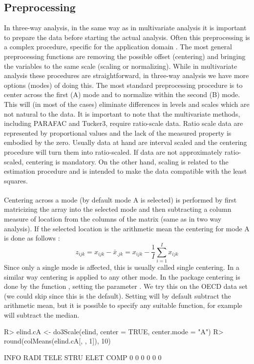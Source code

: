 \documentclass[article,shortnames, nojss]{jss}
\begin{document}
\subsection{Preprocessing}
\label{sec:preprocessing}
In three-way analysis, in the same way as in multivariate analysis it
is important to prepare the data before starting the actual analysis.
Often this preprocessing is a complex procedure, specific for the
application domain \citep[see for example][]{Engelen:2007}. The most
general preprocessing functions are removing the possible offset (centering)
and bringing the variables to the same scale (scaling or normalizing). While
in multivariate analysis these procedures are straightforward, in
three-way analysis we have more options (modes) of doing this. The most
standard preprocessing procedure is to center across the first (A) mode
and to normalize within the second (B) mode. This will (in most of the cases)
eliminate differences in levels and scales which are not natural to the data.
It is important to note that the multivariate methods,
including PARAFAC and Tucker3, require ratio-scale  data.
Ratio scale data are represented by proportional values and the lack
of the measured property is embodied by the zero. Usually data at hand are
interval scaled and the centering procedure will turn them into ratio-scaled.
If data are not approximately ratio-scaled, centering is mandatory.
On the other hand, scaling is related to the estimation procedure
and is intended to make the data compatible with the least squares.\\\\
Centering across a mode (by default mode A is selected) is performed by
first matricizing the array into the selected mode and then subtracting
a column measure of location from the columns of the matrix (same as in two way analysis).
If the selected location is the arithmetic mean the centering for mode A is done as follows :
\[z_{ijk}=x_{ijk}-\bar x_{.jk}=x_{ijk} - \frac{1}{I}\sum \limits_{i=1}^I x_{ijk}
\]
Since only a single mode is affected, this is usually called single centering.
In a similar way centering is applied to any other mode. In the package 
centering is done by the function , setting the parameter .
We try this on the OECD data set (we could skip 
since this is the default). Setting  will by default subtract the
arithmetic mean, but it is possible to specify any suitable function,
for example  will subtract the median.
\begin{Schunk}
\begin{Sinput}
R> elind.cA <- do3Scale(elind, center = TRUE, center.mode = "A")
R> round(colMeans(elind.cA[, , 1]), 10)
\end{Sinput}
\begin{Soutput}
INFO RADI TELE STRU ELET COMP 
   0    0    0    0    0    0 
\end{Soutput}
\end{Schunk}
\end{document}
